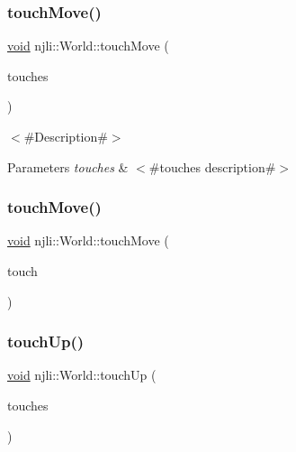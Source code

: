 \subsubsection{\texorpdfstring{touch\+Move()}{touchMove()}\hspace{0.1cm}{\footnotesize\ttfamily [1/2]}}
{\footnotesize\ttfamily \mbox{\hyperlink{_thread_8h_af1e856da2e658414cb2456cb6f7ebc66}{void}} njli\+::\+World\+::touch\+Move (\begin{DoxyParamCaption}\item[{\mbox{\hyperlink{classnjli_1_1_device_touch}{Device\+Touch}} $\ast$$\ast$}]{touches }\end{DoxyParamCaption})}

$<$\#\+Description\#$>$


\begin{DoxyParams}{Parameters}
{\em touches} & $<$\#touches description\#$>$ \\
\hline
\end{DoxyParams}
\mbox{\label{classnjli_1_1_world_a625c469136089b896cc94c7f151ec8e6}} 
\subsubsection{\texorpdfstring{touch\+Move()}{touchMove()}\hspace{0.1cm}{\footnotesize\ttfamily [2/2]}}
{\footnotesize\ttfamily \mbox{\hyperlink{_thread_8h_af1e856da2e658414cb2456cb6f7ebc66}{void}} njli\+::\+World\+::touch\+Move (\begin{DoxyParamCaption}\item[{const \mbox{\hyperlink{classnjli_1_1_device_touch}{Device\+Touch}} \&}]{touch }\end{DoxyParamCaption})}

\mbox{\label{classnjli_1_1_world_a1b2be462f5455b01856968eea7ee96bb}} 
\subsubsection{\texorpdfstring{touch\+Up()}{touchUp()}\hspace{0.1cm}{\footnotesize\ttfamily [1/2]}}
{\footnotesize\ttfamily \mbox{\hyperlink{_thread_8h_af1e856da2e658414cb2456cb6f7ebc66}{void}} njli\+::\+World\+::touch\+Up (\begin{DoxyParamCaption}\item[{\mbox{\hyperlink{classnjli_1_1_device_touch}{Device\+Touch}} $\ast$$\ast$}]{touches }\end{DoxyParamCaption})}


